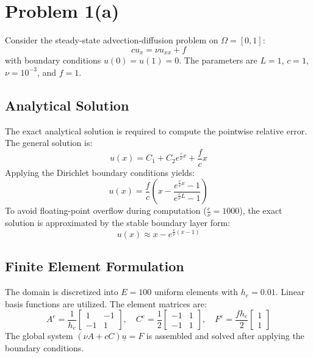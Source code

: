 \documentclass{article}
\begin{document}
\section*{Problem 1(a)}

Consider the steady-state advection-diffusion problem on $\Omega = [0,1]$:
\begin{equation}
    c u_x = \nu u_{xx} + f
\end{equation}
with boundary conditions $u(0) = u(1) = 0$. The parameters are $L=1$, $c=1$, $\nu=10^{-3}$, and $f=1$.

\subsection*{Analytical Solution}
The exact analytical solution is required to compute the pointwise relative error. The general solution is:
\begin{equation}
    u(x) = C_1 + C_2 e^{\frac{c}{\nu}x} + \frac{f}{c}x
\end{equation}
Applying the Dirichlet boundary conditions yields:
\begin{equation}
    u(x) = \frac{f}{c} \left( x - \frac{e^{\frac{c}{\nu}x} - 1}{e^{\frac{c}{\nu}L} - 1} \right)
\end{equation}
To avoid floating-point overflow during computation ($\frac{c}{\nu} = 1000$), the exact solution is approximated by the stable boundary layer form:
\begin{equation}
    u(x) \approx x - e^{\frac{c}{\nu}(x - 1)}
\end{equation}

\subsection*{Finite Element Formulation}
The domain is discretized into $E=100$ uniform elements with $h_e = 0.01$. Linear basis functions are utilized. The element matrices are:
\begin{equation}
    A^e = \frac{1}{h_e} \begin{bmatrix} 1 & -1 \\ -1 & 1 \end{bmatrix}, \quad
    C^e = \frac{1}{2} \begin{bmatrix} -1 & 1 \\ -1 & 1 \end{bmatrix}, \quad
    F^e = \frac{f h_e}{2} \begin{bmatrix} 1 \\ 1 \end{bmatrix}
\end{equation}
The global system $( \nu A + c C ) \underline{u} = F$ is assembled and solved after applying the boundary conditions.
\end{document}
